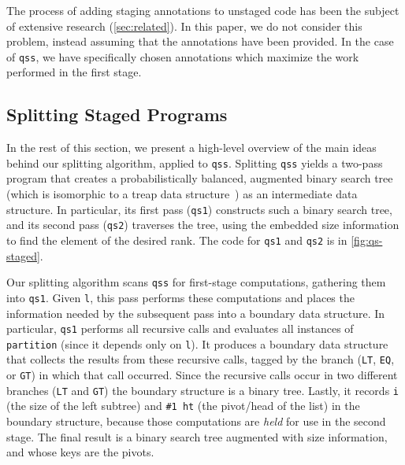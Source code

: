 \begin{abstrsyn}
The process of adding staging annotations to unstaged code has been
the subject of extensive research (\ref{sec:related}). In this paper, we do not
consider this problem, instead assuming that the annotations have been provided.
In the case of \texttt{qss}, we have specifically chosen annotations which
maximize the work performed in the first stage.

\subsection{Splitting Staged Programs}



In the rest of this section, we present a high-level overview of the main ideas
behind our splitting algorithm, applied to \texttt{qss}.
%
Splitting \texttt{qss} yields a two-pass program that creates a
probabilistically balanced, augmented binary search tree (which is isomorphic to
a treap data structure~\cite{SeidelAr96}) as an intermediate data structure. In
particular, its first pass (\texttt{qs1}) constructs such a binary search tree,
and its second pass (\texttt{qs2}) traverses the tree, using the embedded size
information to find the element of the desired rank.
%
The code for \texttt{qs1} and \texttt{qs2} is in \ref{fig:qs-staged}.


Our splitting algorithm scans \texttt{qss} for first-stage computations,
gathering them into \texttt{qs1}. Given \texttt{l}, this pass performs these
computations and places the information needed by the subsequent pass into a
boundary data structure.
%
In particular, \texttt{qs1} performs all recursive calls and evaluates all
instances of \texttt{partition} (since it depends only on \texttt{l}). It
produces a boundary data structure that collects the results from these
recursive calls, tagged by the branch (\texttt{LT}, \texttt{EQ}, or \texttt{GT})
in which that call occurred. Since the recursive calls occur in two different
branches (\texttt{LT} and \texttt{GT}) the boundary structure is a binary tree.  
%
Lastly, it records \texttt{i} (the size of the left subtree) and \texttt{\#1 ht}
(the pivot/head of the list) in the boundary structure, because those
computations are \emph{held} for use in the second stage.
%
The final result is a binary search tree augmented with size information, and
whose keys are the pivots.


\end{abstrsyn}
